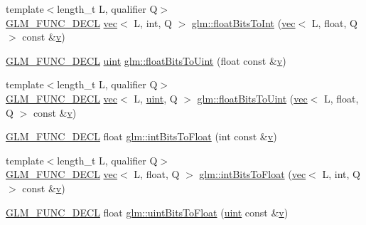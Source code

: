 \begin{DoxyCompactItemize}
{\footnotesize template$<$length\+\_\+t L, qualifier Q$>$ }\\\hyperlink{setup_8hpp_ab2d052de21a70539923e9bcbf6e83a51}{G\+L\+M\+\_\+\+F\+U\+N\+C\+\_\+\+D\+E\+CL} \hyperlink{structglm_1_1vec}{vec}$<$ L, int, Q $>$ \hyperlink{group__core__func__common_ga99f7d62f78ac5ea3b49bae715c9488ed}{glm\+::float\+Bits\+To\+Int} (\hyperlink{structglm_1_1vec}{vec}$<$ L, float, Q $>$ const \&\hyperlink{_s_d_l__opengl_8h_a10a82eabcb59d2fcd74acee063775f90}{v})
\item 
\hyperlink{setup_8hpp_ab2d052de21a70539923e9bcbf6e83a51}{G\+L\+M\+\_\+\+F\+U\+N\+C\+\_\+\+D\+E\+CL} \hyperlink{group__core__precision_ga4fd29415871152bfb5abd588334147c8}{uint} \hyperlink{group__core__func__common_ga748b4d2819b48d28ca09dc8733488873}{glm\+::float\+Bits\+To\+Uint} (float const \&\hyperlink{_s_d_l__opengl_8h_a10a82eabcb59d2fcd74acee063775f90}{v})
\item 
{\footnotesize template$<$length\+\_\+t L, qualifier Q$>$ }\\\hyperlink{setup_8hpp_ab2d052de21a70539923e9bcbf6e83a51}{G\+L\+M\+\_\+\+F\+U\+N\+C\+\_\+\+D\+E\+CL} \hyperlink{structglm_1_1vec}{vec}$<$ L, \hyperlink{group__core__precision_ga4fd29415871152bfb5abd588334147c8}{uint}, Q $>$ \hyperlink{group__core__func__common_ga49418ba4c8a60fbbb5d57b705f3e26db}{glm\+::float\+Bits\+To\+Uint} (\hyperlink{structglm_1_1vec}{vec}$<$ L, float, Q $>$ const \&\hyperlink{_s_d_l__opengl_8h_a10a82eabcb59d2fcd74acee063775f90}{v})
\item 
\hyperlink{setup_8hpp_ab2d052de21a70539923e9bcbf6e83a51}{G\+L\+M\+\_\+\+F\+U\+N\+C\+\_\+\+D\+E\+CL} float \hyperlink{group__core__func__common_ga2650dc57b2148a6ffbce20944fb4d97a}{glm\+::int\+Bits\+To\+Float} (int const \&\hyperlink{_s_d_l__opengl_8h_a10a82eabcb59d2fcd74acee063775f90}{v})
\item 
{\footnotesize template$<$length\+\_\+t L, qualifier Q$>$ }\\\hyperlink{setup_8hpp_ab2d052de21a70539923e9bcbf6e83a51}{G\+L\+M\+\_\+\+F\+U\+N\+C\+\_\+\+D\+E\+CL} \hyperlink{structglm_1_1vec}{vec}$<$ L, float, Q $>$ \hyperlink{group__core__func__common_ga7a0a8291a1cf3e1c2aee33030a1bd7b0}{glm\+::int\+Bits\+To\+Float} (\hyperlink{structglm_1_1vec}{vec}$<$ L, int, Q $>$ const \&\hyperlink{_s_d_l__opengl_8h_a10a82eabcb59d2fcd74acee063775f90}{v})
\item 
\hyperlink{setup_8hpp_ab2d052de21a70539923e9bcbf6e83a51}{G\+L\+M\+\_\+\+F\+U\+N\+C\+\_\+\+D\+E\+CL} float \hyperlink{group__core__func__common_ga97464ca9ff4267de30ea408f700d4ca8}{glm\+::uint\+Bits\+To\+Float} (\hyperlink{group__core__precision_ga4fd29415871152bfb5abd588334147c8}{uint} const \&\hyperlink{_s_d_l__opengl_8h_a10a82eabcb59d2fcd74acee063775f90}{v})

\end{DoxyCompactItemize}
